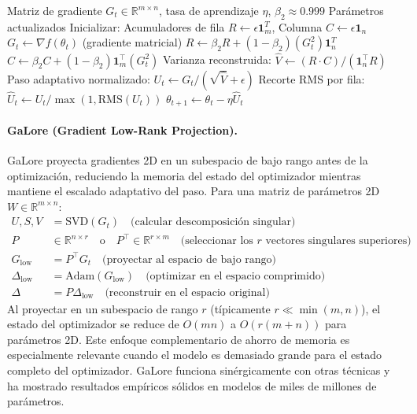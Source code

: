 \begin{algorithm}[H]
\caption{Adafactor (Estadísticas de Segundo Momento Factorizadas)}
\label{alg:adafactor}
\begin{algorithmic}[1]
\Require Matriz de gradiente $G_t \in \mathbb{R}^{m \times n}$, tasa de aprendizaje $\eta$, $\beta_2 \approx 0.999$
\Ensure Parámetros actualizados
\State Inicializar: Acumuladores de fila $R \gets \epsilon \mathbf{1}^T_m$, Columna $C \gets \epsilon \mathbf{1}_n$
    \State $G_t \gets \nabla f(\theta_t)$ (gradiente matricial)
    \State $R \gets \beta_2 R + (1-\beta_2) (G_t^2) \mathbf{1}_n^T$ 
    \State $C \gets \beta_2 C + (1-\beta_2) \mathbf{1}_m^\top (G_t^2)$ 
    \State Varianza reconstruida: $\hat{V} \gets (R \cdot C) / (\mathbf{1}_n^\top R)$ 
    \State Paso adaptativo normalizado: $U_t \gets G_t / (\sqrt{\hat{V}} + \epsilon)$
    \State Recorte RMS por fila: $\hat{U}_t \gets U_t / \max(1, \text{RMS}(U_t))$
    \State $\theta_{t+1} \gets \theta_t - \eta \hat{U}_t$
\EndFor
\end{algorithmic}
\end{algorithm}

\paragraph{GaLore (Gradient Low-Rank Projection).}
GaLore proyecta gradientes 2D en un subespacio de bajo rango antes de la optimización, reduciendo la memoria del estado del optimizador mientras mantiene el escalado adaptativo del paso. Para una matriz de parámetros 2D $W \in \mathbb{R}^{m \times n}$:
\begin{align}
U, S, V &= \text{SVD}(G_t) \quad\text{(calcular descomposición singular)} \\
P &\in \mathbb{R}^{n \times r} \quad\text{o} \quad P^\top \in \mathbb{R}^{r \times m} \quad\text{(seleccionar los $r$ vectores singulares superiores)} \\
G_{\text{low}} &= P^\top G_t \quad\text{(proyectar al espacio de bajo rango)} \\
\Delta_{\text{low}} &= \text{Adam}(G_{\text{low}}) \quad\text{(optimizar en el espacio comprimido)} \\
\Delta &= P \Delta_{\text{low}} \quad\text{(reconstruir en el espacio original)}
\end{align}
Al proyectar en un subespacio de rango $r$ (típicamente $r \ll \min(m,n)$), el estado del optimizador se reduce de $O(mn)$ a $O(r(m+n))$ para parámetros 2D. Este enfoque complementario de ahorro de memoria es especialmente relevante cuando el modelo es demasiado grande para el estado completo del optimizador. GaLore funciona sinérgicamente con otras técnicas y ha mostrado resultados empíricos sólidos en modelos de miles de millones de parámetros.

